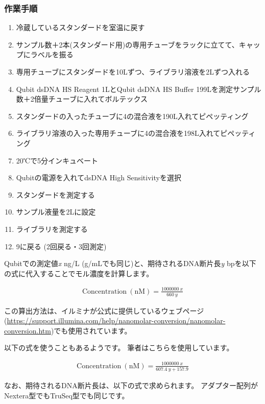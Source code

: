 \documentclass[titlepage,10pt,a4paper,uplatex]{jsbook}
\begin{document}
\subsubsection{作業手順}
\begin{enumerate}
\item 冷蔵しているスタンダードを室温に戻す
\item サンプル数＋2本(スタンダード用)の専用チューブをラックに立てて、キャップにラベルを振る
\item 専用チューブにスタンダードを10{\textmu}Lずつ、ライブラリ溶液を2{\textmu}Lずつ入れる
\item Qubit dsDNA HS Reagent 1{\textmu}LとQubit dsDNA HS Buffer 199{\textmu}Lを測定サンプル数＋2倍量チューブに入れてボルテックス
\item スタンダードの入ったチューブに4の混合液を190{\textmu}L入れてピペッティング
\item ライブラリ溶液の入った専用チューブに4の混合液を198{\textmu}L入れてピペッティング
\item 20℃で5分インキュベート
\item Qubitの電源を入れてdsDNA High Sensitivityを選択
\item スタンダードを測定する
\item サンプル液量を2{\textmu}Lに設定
\item ライブラリを測定する
\item 9に戻る (2回戻る・3回測定)
\end{enumerate}

Qubitでの測定値\textit{x} ng/{\textmu}L ({\textmu}g/mLでも同じ)と、期待されるDNA断片長\textit{y} bpを以下の式に代入することでモル濃度を計算します。

\begin{align*}
\mathrm{Concentration~(nM)} = \frac{1000000\ x}{660\ y}
\end{align*}

この算出方法は、イルミナが公式に提供しているウェブページ(\url{https://support.illumina.com/help/nanomolar-conversion/nanomolar-conversion.htm})でも使用されています。

以下の式を使うこともあるようです。
筆者はこちらを使用しています。

\begin{align*}
\mathrm{Concentration~(nM)} = \frac{1000000\ x}{607.4\ y + 157.9}
\end{align*}

なお、期待されるDNA断片長は、以下の式で求められます。
アダプター配列がNextera型でもTruSeq型でも同じです。
\end{document}
